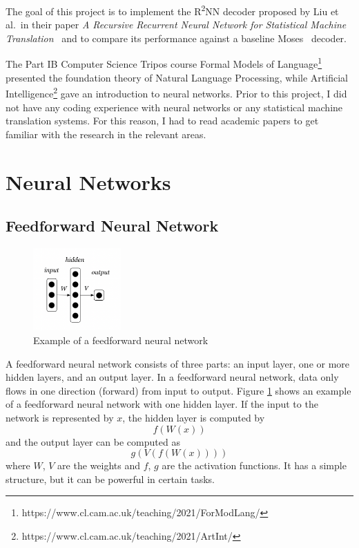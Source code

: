 \documentclass[12pt,a4paper,twoside]{report}
\begin{document}
The goal of this project is to implement the R\textsuperscript{2}NN decoder proposed by Liu et al.~in their paper \textit{A Recursive Recurrent Neural Network for Statistical Machine Translation}~\cite{r2nn} and to compare its performance against a baseline Moses~\cite{moses} decoder.

The Part IB Computer Science Tripos course Formal Models of Language\footnote{https://www.cl.cam.ac.uk/teaching/2021/ForModLang/} presented the foundation theory of Natural Language Processing, while Artificial Intelligence\footnote{https://www.cl.cam.ac.uk/teaching/2021/ArtInt/} gave an introduction to neural networks. Prior to this project, I did not have any coding experience with neural networks or any statistical machine translation systems. For this reason, I had to read academic papers to get familiar with the research in the relevant areas.

\section{Neural Networks}

\subsection{Feedforward Neural Network}
\begin{figure}[ht]
\centering
\includegraphics[width=0.3\textwidth]{images/fnn.png}
\caption{Example of a feedforward neural network}
\label{fig:fnn}
\end{figure}
A feedforward neural network consists of three parts: an input layer, one or more hidden layers, and an output layer. In a feedforward neural network, data only flows in one direction (forward) from input to output. Figure \ref{fig:fnn} shows an example of a feedforward neural network with one hidden layer. If the input to the network is represented by $x$, the hidden layer is computed by
\[f(W(x))\]
and the output layer can be computed as
\[g(V(f(W(x))))\]
where $W$, $V$ are the weights and $f$, $g$ are the activation functions. It has a simple structure, but it can be powerful in certain tasks.
\end{document}
